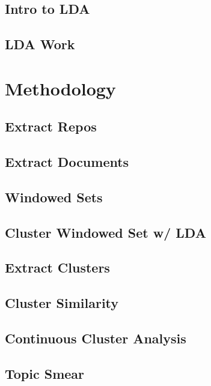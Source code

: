\documentclass{report}
\begin{document}
\subsection{Intro to LDA}
\subsection{LDA Work}
\section{Methodology}
\subsection{Extract Repos}
\subsection{Extract Documents}
\subsection{Windowed Sets}
\subsection{Cluster Windowed Set w/ LDA}
\subsection{Extract Clusters}
\subsection{Cluster Similarity}
\subsection{Continuous Cluster Analysis}
\subsection{Topic Smear}
\end{document}
